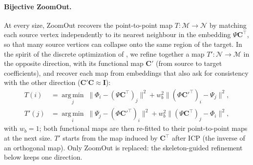\documentclass[11pt]{article}
\newcommand{\M}{\mathcal{M}}
\newcommand{\N}{\mathcal{N}}
\newcommand{\C}{\mathbf{C}}
\begin{document}
\paragraph{Bijective ZoomOut.}
At every size, ZoomOut recovers the point-to-point map $T:\M\to\N$ by
matching each source vertex independently to its nearest neighbour in the
embedding $\Psi\C^\top$, so that many source vertices can collapse onto the
same region of the target. In the spirit of the discrete optimization
of \citet{ren2021discrete}, we refine together a map $T':\N\to\M$ in the
opposite direction, with its functional map $\C'$ (from source to target
coefficients), and recover each map from embeddings that also ask for
consistency with the other direction ($\C'\C \approx \mathbf{I}$):
\begin{align}
  T(i)  &= \operatorname*{arg\,min}_{j} \;\big\|\Phi_i - (\Psi\C^\top)_j\big\|^2 + w_b^2 \big\|(\Phi\C'^\top)_i - \Psi_j\big\|^2 , \\
  T'(j) &= \operatorname*{arg\,min}_{i} \;\big\|\Psi_j - (\Phi\C'^\top)_i\big\|^2 + w_b^2 \big\|(\Psi\C^\top)_j - \Phi_i\big\|^2 ,
\end{align}
with $w_b = 1$; both functional maps are then re-fitted to their
point-to-point maps at the next size. $T'$ starts from the map induced by
$\C^\top$ after ICP (the inverse of an orthogonal map). Only ZoomOut is
replaced: the skeleton-guided refinement below keeps one direction.
\end{document}
